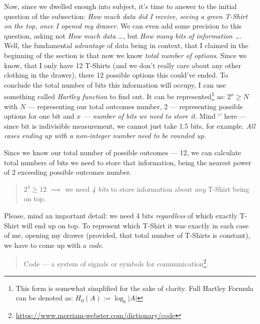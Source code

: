 \documentclass{article}
\begin{document}
            Now, since we dwelled enough into subject, it's time to answer to the initial question of the subsection: \emph{How much data did I receive, seeing a green 
            T-Shirt on the top, once I opened my drawer}. We can even add some precision to this question, asking not \emph{How much data \ldots}, but \emph{How many bits of information \ldots}.
            Well, the fundamental \emph{advantage} of data being in context, that I claimed in the beginning of the section is that now we know \emph{total number of options}.
            Since we know, that I only have 12 T-Shirts (and we don't really care about any other clothing in the drawer), there 12 possible options this could've ended. To 
            conclude the total number of bits this information will occupy, I can use something called \emph{Hartley function} to find out. It can be 
            represented\footnote{This form is somewhat simplified for the sake of clarity. Full Hartley Formula can be denoted as: $H_0(A) := \log_b|A|$}
            as: $2^x \geq N$ with $N$ --- representing our total outcomes number, 2 --- representing possible options for one bit and 
            \emph{$x$ --- number of bits we need to store it}.
            Mind `\geq' here --- since bit is indivisible measurement, we cannot just take 1.5 bits, for example.
            \emph{All cases ending up with a non-integer number need to be rounded up}. \par

            Since we know our total number of possible outcomes --- 12, we can calculate total numbers of bits we need to store that information, being the nearest power of 2
            exceeding possible outcomes number.
            
            \begin{quote}
                $2^4 \geq 12$ $\implies$ we need \emph{4 bits} to store information about \emph{any} T-Shirt being on top.
            \end{quote}

            Please, mind an important detail: we need 4 bits \emph{regardless} of which exactly T-Shirt will end up on top. To represent which T-Shirt it was exactly
            in each case of me, opening my drawer (provided, that total number of T-Shirts is constant), we have to come up with a \emph{code}.

            \begin{quote}
                Code --- a system of signals or symbols for communication\footnote{\href{https://www.merriam-webster.com/dictionary/code}{https://www.merriam-webster.com/dictionary/code}}.
            \end{quote}
\end{document}
